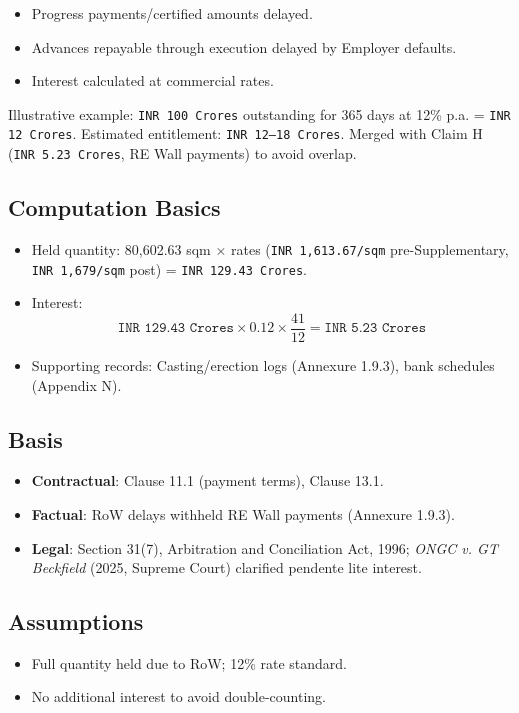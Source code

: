 \documentclass[12pt,letterpaper]{article}
\begin{document}
	\begin{itemize}
		\item Progress payments/certified amounts delayed.
		\item Advances repayable through execution delayed by Employer defaults.
		\item Interest calculated at commercial rates.
	\end{itemize}
	Illustrative example: \texttt{INR 100 Crores} outstanding for 365 days at 12\% p.a. = \texttt{INR 12 Crores}. Estimated entitlement: \texttt{INR 12--18 Crores}. Merged with Claim H (\texttt{INR 5.23 Crores}, RE Wall payments) to avoid overlap.
	
	\subsection*{Computation Basics}
	\begin{itemize}
		\item Held quantity: 80,602.63 sqm $\times$ rates (\texttt{INR 1,613.67/sqm} pre-Supplementary, \texttt{INR 1,679/sqm} post) = \texttt{INR 129.43 Crores}.
		\item Interest:
		\[
		\texttt{INR 129.43 Crores} \times 0.12 \times \frac{41}{12} = \texttt{INR 5.23 Crores}
		\]
		\item Supporting records: Casting/erection logs (Annexure 1.9.3), bank schedules (Appendix N).
	\end{itemize}
	
	\subsection*{Basis}
	\begin{itemize}
		\item \textbf{Contractual}: Clause 11.1 (payment terms), Clause 13.1.
		\item \textbf{Factual}: RoW delays withheld RE Wall payments (Annexure 1.9.3).
		\item \textbf{Legal}: Section 31(7), Arbitration and Conciliation Act, 1996; \textit{ONGC v. GT Beckfield} (2025, Supreme Court) clarified pendente lite interest.
	\end{itemize}
	
	\subsection*{Assumptions}
	\begin{itemize}
		\item Full quantity held due to RoW; 12\% rate standard.
		\item No additional interest to avoid double-counting.
	\end{itemize}
	
\end{document}
